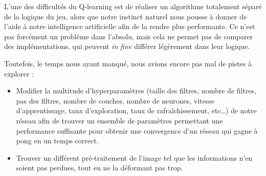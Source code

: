 \documentclass[
    10pt,
    a4paper,
    oneside,
    headinclude,footinclude,
    BCOR=5mm,
    captions=tableabove
]{scrartcl}
\begin{document}
L'une des difficultés du Q-learning est de réaliser un algorithme totalement séparé de la logique du jeu, alors que notre instinct naturel nous pousse à donner de l'aide à notre intelligence artificielle afin de la rendre plus performante. Ce n'est pas forcément un problème dans l'absolu, mais cela ne permet pas de comparer des implémentations, qui peuvent \textit{in fine} différer légèrement dans leur logique.

Toutefois, le temps nous ayant manqué, nous avions encore pas mal de pistes à explorer :

\begin{itemize}
\item Modifier la multitude d’hyperparamètres (taille des filtres, nombre de filtres, pas des filtres, nombre de couches, nombre de neurones, vitesse d’apprentissage, taux d’exploration, taux de rafraîchissement, etc…) de notre réseau afin de trouver un ensemble de paramètres permettant une performance suffisante pour obtenir une convergence d’un réseau qui gagne à pong en un temps correct.
\item Trouver un différent pré-traitement de l’image tel que les informations n’en soient pas perdues, tout en ne la déformant pas trop.
\end{itemize}

\newpage
\renewcommand{\refname}{\spacedlowsmallcaps{Références}} %
\nocite{*}


\end{document}
